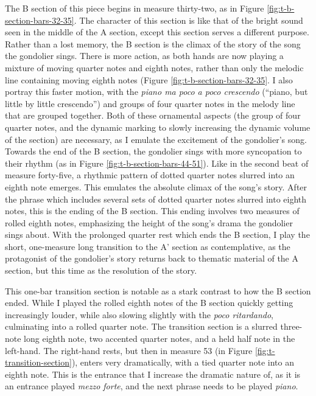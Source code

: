 The B section of this piece begins in measure thirty-two, as in Figure \ref{fig:t-b-section-bars-32-35}\autocite{Henle_2002}. The character of this section is like that of the bright sound seen in the middle of the A section, except this section serves a different purpose. Rather than a lost memory, the B section is the climax of the story of the song the gondolier sings. There is more action, as both hands are now playing a mixture of moving quarter notes and eighth notes, rather than only the melodic line containing moving eighth notes (Figure \ref{fig:t-b-section-bars-32-35}\autocite{Henle_2002}. I also portray this faster motion, with the \textit{piano ma poco a poco crescendo} (``piano, but little by little crescendo'') and groups of four quarter notes in the melody line that are grouped together. Both of these ornamental aspects (the group of four quarter notes, and the dynamic marking to slowly increasing the dynamic volume of the section) are necessary, as I emulate the excitement of the gondolier's song. Towards the end of the B section, the gondolier sings with more syncopation to their rhythm (as in Figure \ref{fig:t-b-section-bars-44-51}\autocite{Henle_2002}). Like in the second beat of measure forty-five, a rhythmic pattern of dotted quarter notes slurred into an eighth note emerges. This emulates the absolute climax of the song's story. After the phrase which includes several sets of dotted quarter notes slurred into eighth notes, this is the ending of the B section. This ending involves two measures of rolled eighth notes, emphasizing the height of the song's drama the gondolier sings about. With the prolonged quarter rest which ends the B section, I play the short, one-measure long transition to the A' section as contemplative, as the protagonist of the gondolier's story returns back to thematic material of the A section, but this time as the resolution of the story.

This one-bar transition section is notable as a stark contrast to how the B section ended. While I played the rolled eighth notes of the B section quickly getting increasingly louder, while also slowing slightly with the \textit{poco ritardando}, culminating into a rolled quarter note. The transition section is a slurred three-note long eighth note, two accented quarter notes, and a held half note in the left-hand. The right-hand rests, but then in measure 53 (in Figure \ref{fig:t-transition-section}\autocite{Henle_2002}), enters very dramatically, with a tied quarter note into an eighth note. This is the entrance that I increase the dramatic nature of, as it is an entrance played \textit{mezzo forte}, and the next phrase needs to be played \textit{piano}.

